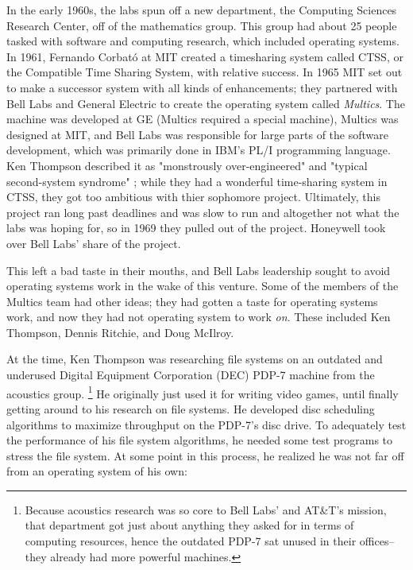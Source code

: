 In the early 1960s, the labs spun off a new department, the Computing Sciences Research Center,
off of the mathematics group. This group had about 25 people tasked with software and computing
research, which included operating systems.
In 1961, Fernando Corbat\'{o} at MIT created a timesharing system called CTSS,
or the Compatible Time Sharing System, with relative success.
In 1965 MIT set out to make a successor system with all kinds of enhancements; they partnered with
Bell Labs and General Electric to create the operating system called \textit{Multics}.
The machine was developed at GE (Multics required a special machine), Multics was designed at MIT,
and Bell Labs was responsible for large parts of the software development,
which was primarily done in IBM's PL/I programming language.
Ken Thompson described it as "monstrously over-engineered" and "typical second-system syndrome"
\cite{kernighan_interviews_thompson_2019};
while they had a wonderful time-sharing system in CTSS, they got too ambitious with thier sophomore project.
Ultimately, this project ran long past deadlines and was slow to run and altogether not what
the labs was hoping for, so in 1969 they pulled out of the project.
Honeywell took over Bell Labs' share of the project.

This left a bad taste in their mouths, and Bell Labs leadership sought to avoid operating
systems work in the wake of this venture.
Some of the members of the Multics team had other ideas; they had gotten a taste for
operating systems work, and now they had not operating system to work \textit{on}.
These included Ken Thompson, Dennis Ritchie, and Doug McIlroy.

At the time, Ken Thompson was researching file systems on an outdated and underused
Digital Equipment Corporation (DEC) PDP-7 machine from the acoustics group.
\footnote{Because acoustics research was so core to Bell Labs' and AT\&T's mission,
that department got just about anything they asked for in terms of computing resources,
hence the outdated PDP-7 sat unused in their offices--they already had more powerful machines.}
He originally just used it for writing video games, until finally getting around to
his research on file systems.
He developed disc scheduling algorithms to maximize throughput on the PDP-7's disc drive.
To adequately test the performance of his file system algorithms, he needed some test
programs to stress the file system.
At some point in this process, he realized he was not far off from an
operating system of his own\cite{kernighan_interviews_thompson_2019}:

